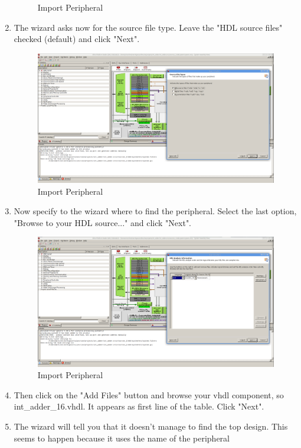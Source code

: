 \documentclass{article}
\begin{document}
\begin{enumerate}
\begin{figure}
	\caption{Import Peripheral}
	\end{figure}
	\item The wizard asks now for the source file type. Leave the "HDL source
	files" checked (default) and click "Next".
	\begin{figure}
	\includegraphics[scale=0.25]{pictures/ImportPeripheral5.png}
	\caption{Import Peripheral}
	\end{figure}
	\item Now specify to the wizard where to find the peripheral. Select the
	last option, "Browse to your HDL source..." and click "Next".
	\begin{figure}
	\includegraphics[scale=0.25]{pictures/ImportPeripheral7.png}
	\caption{Import Peripheral}
	\end{figure}
	\item Then click on the "Add Files" button and browse your vhdl component,
	so int\_adder\_16.vhdl. It appears as first line of the table.
	Click "Next".
	\item The wizard will tell you that it doesn't manage to find the top
	design. This seems to happen because it uses the name of the peripheral

\end{enumerate}
\end{document}
